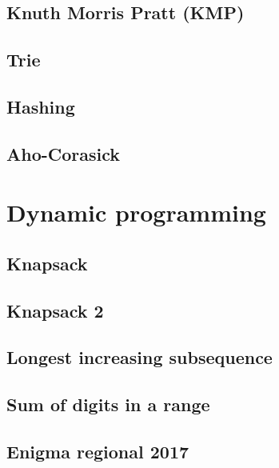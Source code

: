 \subsection{Knuth Morris Pratt (KMP)}
\raggedbottom
\hrulefill
\subsection{Trie}
\raggedbottom
\hrulefill
\subsection{Hashing}
\raggedbottom
\hrulefill
\subsection{Aho-Corasick}
\raggedbottom
\hrulefill

\section{Dynamic programming}
\subsection{Knapsack}
\raggedbottom
\hrulefill
\subsection{Knapsack 2}
\raggedbottom
\hrulefill
\subsection{Longest increasing subsequence}
\raggedbottom
\hrulefill
\subsection{Sum of digits in a range}
\raggedbottom
\hrulefill
\subsection{Enigma regional 2017}
\raggedbottom
\hrulefill
